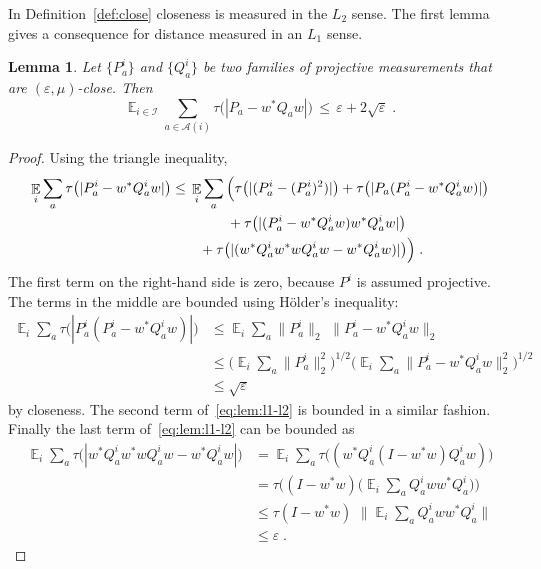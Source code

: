 \documentclass[11pt]{article}
\newtheorem{lemma}[theorem]{Lemma}
\theoremstyle{definition}
\DeclareMathOperator*{\Expectation}{\mathbb{E}}
\newcommand{\Es}[1]{\Expectation_{#1}}
\newcommand{\mA}{\ensuremath{\mathcal{A}}}
\newcommand{\mI}{\ensuremath{\mathcal{I}}}
\newcommand{\eps}{\varepsilon}
\begin{document}
In Definition~\ref{def:close} closeness is measured in the $L_2$ sense. The first lemma gives a consequence for distance measured in an $L_1$ sense. 


\begin{lemma}\label{lem:l1-l2}
Let $\{P_a^i\}$ and $\{Q_a^i\}$ be two families of projective measurements that are $(\eps,\mu)$-close. Then 
\begin{equation}\label{eq:l1-l2}
\Es{i\in\mI} \sum_{a\in \mA(i)} \tau\big(|P_a-w^*Q_aw|\big) \,\leq\, \eps+ 2 \sqrt{\eps}\;.
\end{equation}
\end{lemma}

\begin{proof}
Using the triangle inequality, 
\begin{align}
\Es{i} \sum_a \tau\big(|P^i_a - w^* Q^i_a w|\big) &\leq\, \Es{i}\sum_a \Big(\tau\big(|(P^i_a-(P^i_a)^2)|\big) + \tau\big(|P_a(P^i_a-w^*Q^i_aw)|\big) \notag\\
&\qquad\qquad+ \tau\big(|(P^i_a-w^*Q^i_aw)w^*Q^i_aw|\big) \notag \\
 \label{eq:lem:l1-l2}
&\qquad +\tau\big(| (w^*Q^i_aw^*wQ^i_aw-w^*Q^i_aw)|\big)\Big)\;.
\end{align}
The first term on the right-hand side is zero, because $P^i$ is assumed projective. The terms in the middle are bounded using H\"older's inequality:
\begin{align*}
\Es{i}\sum_a  \tau\big(|P^i_a(P^i_a-w^*Q^i_aw)|\big) &\leq \Es{i} \sum_a \|P^i_a\|_2 \, \, \|P^i_a-w^*Q^i_aw\|_2\\
&\leq \Big(\Es{i}\sum_a \|P^i_a\|^2_2\Big)^{1/2}\Big( \Es{i}\sum_a  \|P^i_a-w^*Q^i_aw\|_2^2 \Big)^{1/2}\\
&\leq \sqrt{\eps}
\end{align*}
by closeness. The second term of~\eqref{eq:lem:l1-l2} is bounded in a similar fashion.
Finally the last term of~\eqref{eq:lem:l1-l2} can be bounded as 
\begin{align*}
\Es{i}\sum_a \tau\big(| w^*Q^i_aw^*wQ^i_aw-w^*Q^i_aw|\big) &= \Es{i}\sum_a \tau\big( (w^*Q^i_a(I - w^*w)Q^i_aw)\big)\\
&=  \tau\Big( (I-w^*w)\Big(\Es{i}\sum_a Q^i_aww^* Q^i_a\Big)\Big)\\
&\leq \tau(I-w^*w) \,\, \Big\|\Es{i}\sum_a Q^i_aww^* Q^i_a\Big\|\\
&\leq \eps\;.
\end{align*}
\end{proof}
\end{document}
